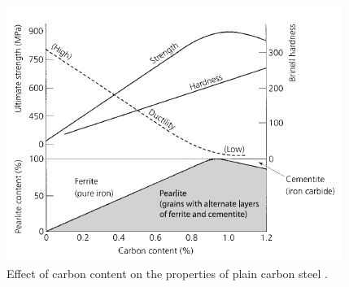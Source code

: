 \documentclass[12pt]{report}
\begin{document}
\begin{figure}[H]
    \centering
    \includegraphics[width=.65\textwidth]{effect_of_carbon_content.jpg}
    \caption{Effect of carbon content on the properties of plain carbon steel \cite{timings2008fabrication}.}
    \label{ch3:figure:carbon}
\end{figure}
\end{document}
